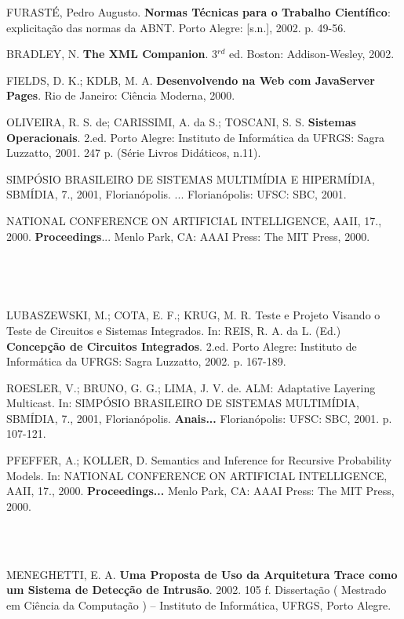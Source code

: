 \documentclass[rel_mlp]{iiufrgs}
\begin{document}
\noindent FURASTÉ, Pedro Augusto. {\bf Normas Técnicas para o Trabalho Científico}: explicitação das normas da ABNT. Porto Alegre: [s.n.], 2002. p. 49-56.

\noindent BRADLEY, N. {\bf The XML Companion}. 3${}^{rd}$ ed. Boston: Addison-Wesley, 2002.

\noindent FIELDS, D. K.; KDLB, M. A. {\bf Desenvolvendo na Web com JavaServer Pages}. Rio de Janeiro: Ciência Moderna, 2000.

\noindent OLIVEIRA, R. S. de; CARISSIMI, A. da S.; TOSCANI, S. S. {\bf Sistemas Operacionais}. 2.ed. Porto Alegre: Instituto de Informática da UFRGS: Sagra Luzzatto, 2001. 247 p. (Série Livros Didáticos, n.11).

\noindent SIMPÓSIO BRASILEIRO DE SISTEMAS MULTIMÍDIA E HIPERMÍDIA, SBMÍDIA, 7., 2001, Florianópolis. ... Florianópolis: UFSC: SBC, 2001.

\noindent NATIONAL CONFERENCE ON ARTIFICIAL INTELLIGENCE, AAII, 17., 2000. {\bf Proceedings}... Menlo Park, CA: AAAI Press: The MIT Press, 2000.

\noindent ~

\\


\noindent LUBASZEWSKI, M.; COTA, E. F.; KRUG, M. R. Teste e Projeto Visando o Teste de Circuitos e Sistemas Integrados. In: REIS, R. A. da L. (Ed.) {\bf Concepção de Circuitos Integrados}. 2.ed. Porto Alegre: Instituto de Informática da UFRGS: Sagra Luzzatto, 2002. p. 167-189.

\noindent ROESLER, V.; BRUNO, G. G.; LIMA, J. V. de. ALM: Adaptative Layering Multicast. In: SIMPÓSIO BRASILEIRO DE SISTEMAS MULTIMÍDIA, SBMÍDIA, 7., 2001, Florianópolis. {\bf Anais...} Florianópolis: UFSC: SBC, 2001. p. 107-121.

\noindent PFEFFER, A.; KOLLER, D. Semantics and Inference for Recursive Probability Models. In: NATIONAL CONFERENCE ON ARTIFICIAL INTELLIGENCE, AAII, 17., 2000. {\bf Proceedings... }Menlo Park, CA: AAAI Press: The MIT Press, 2000.

\noindent ~

\\

\noindent MENEGHETTI, E. A. {\bf Uma Proposta de Uso da Arquitetura Trace como um Sistema de Detecção de Intrusão}. 2002. 105 f. Dissertação ( Mestrado em Ciência da Computação ) -- Instituto de Informática, UFRGS, Porto Alegre.
\end{document}
